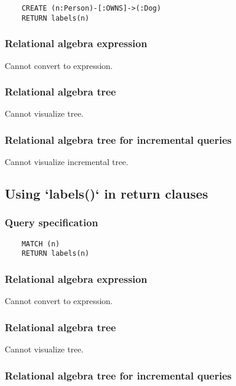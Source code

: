 	\begin{lstlisting}
	CREATE (n:Person)-[:OWNS]->(:Dog)
	RETURN labels(n)
	\end{lstlisting}


	\subsubsection*{Relational algebra expression}

	Cannot convert to expression.

	\subsubsection*{Relational algebra tree}

	Cannot visualize tree.

	\subsubsection*{Relational algebra tree for incremental queries}

	Cannot visualize incremental tree.
	\subsection{Using `labels()` in return clauses}

	\subsubsection*{Query specification}

	\begin{lstlisting}
	MATCH (n)
	RETURN labels(n)
	\end{lstlisting}


	\subsubsection*{Relational algebra expression}

	Cannot convert to expression.

	\subsubsection*{Relational algebra tree}

	Cannot visualize tree.

	\subsubsection*{Relational algebra tree for incremental queries}

